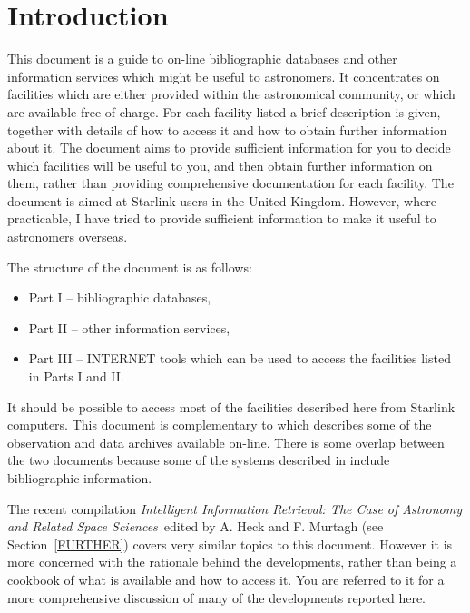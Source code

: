 \documentclass[twoside,11pt,nolof]{starlink}
\begin{document}
\scfrontmatter

\section{Introduction}

This document is a guide to on-line bibliographic databases and other
information services which might be useful to astronomers. It
concentrates on facilities which are either provided within the
astronomical community, or which are available free of charge. For
each facility listed a brief description is given, together with details
of how to access it and how to obtain further information about it.
The document aims to provide sufficient information for you to decide
which facilities will be useful to you, and then obtain further
information on them, rather than providing comprehensive documentation
for each facility. The document is aimed at Starlink users in the
United Kingdom. However, where practicable, I have tried to provide
sufficient information to make it useful to astronomers overseas.

The structure of the document is as follows:

\begin{itemize}

  \item Part I -- bibliographic databases,

  \item Part II -- other information services,

  \item Part III -- INTERNET tools which can be used to access the
   facilities listed in Parts I and II.

\end{itemize}

It should be possible to access most of the facilities described here
from Starlink computers. This document is complementary to
 which
describes some of the observation and data archives available on-line.
There is some overlap between the two documents because some of the
systems described in
 include bibliographic information.

The recent compilation \textit{Intelligent Information Retrieval: The
Case of Astronomy and Related Space Sciences}\, edited by A. Heck and
F. Murtagh (see Section~\ref{FURTHER}) covers very similar topics to
this document. However it is more concerned with the rationale behind
the developments, rather than being a cookbook of what is available
and how to access it.  You are referred to it for a more comprehensive
discussion of many of the developments reported here.
\end{document}
